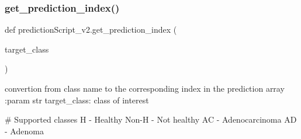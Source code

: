 \subsubsection{\texorpdfstring{get\+\_\+prediction\+\_\+index()}{get\_prediction\_index()}}
{\footnotesize\ttfamily def prediction\+Script\+\_\+v2.\+get\+\_\+prediction\+\_\+index (\begin{DoxyParamCaption}\item[{}]{target\+\_\+class }\end{DoxyParamCaption})}

\begin{DoxyVerb}convertion from class name to the corresponding index in the prediction array
:param str target_class: class of interest

# Supported classes
H - Healthy
Non-H - Not healthy
AC - Adenocarcinoma
AD - Adenoma
\end{DoxyVerb}
 